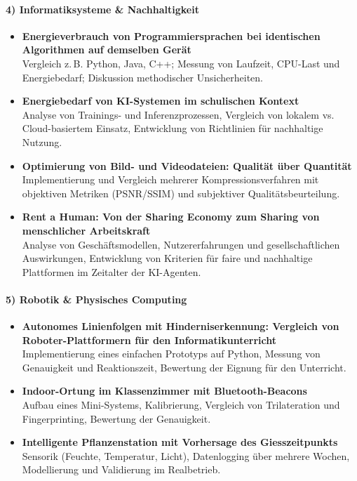 \paragraph{4) Informatiksysteme \& Nachhaltigkeit}
\begin{itemize}
    \item \textbf{Energieverbrauch von Programmiersprachen bei identischen Algorithmen auf demselben Gerät}\\
    Vergleich z.\,B. Python, Java, C++; Messung von Laufzeit, CPU-Last und Energiebedarf; Diskussion methodischer Unsicherheiten.
    \item \textbf{Energiebedarf von KI-Systemen im schulischen Kontext}\\
    Analyse von Trainings- und Inferenzprozessen, Vergleich von lokalem vs. Cloud-basiertem Einsatz, Entwicklung von Richtlinien für nachhaltige Nutzung.
    \item \textbf{Optimierung von Bild- und Videodateien: Qualität über Quantität}\\
    Implementierung und Vergleich mehrerer Kompressionsverfahren mit objektiven Metriken (PSNR/SSIM) und subjektiver Qualitätsbeurteilung.
    \item \textbf{Rent a Human: Von der Sharing Economy zum Sharing von menschlicher Arbeitskraft}\\
    Analyse von Geschäftsmodellen, Nutzererfahrungen und gesellschaftlichen Auswirkungen, Entwicklung von Kriterien für faire und nachhaltige Plattformen im Zeitalter der KI-Agenten.
\end{itemize}

\paragraph{5) Robotik \& Physisches Computing}
\begin{itemize}
    \item[\faStar{}] \textbf{Autonomes Linienfolgen mit Hinderniserkennung: Vergleich von Roboter-Plattformern für den Informatikunterricht}\\
    Implementierung eines einfachen Prototyps auf Python, Messung von Genauigkeit und Reaktionszeit, Bewertung der Eignung für den Unterricht.
    \item \textbf{Indoor-Ortung im Klassenzimmer mit Bluetooth-Beacons}\\
    Aufbau eines Mini-Systems, Kalibrierung, Vergleich von Trilateration und Fingerprinting, Bewertung der Genauigkeit.
    \item \textbf{Intelligente Pflanzenstation mit Vorhersage des Giesszeitpunkts}\\
    Sensorik (Feuchte, Temperatur, Licht), Datenlogging über mehrere Wochen, Modellierung und Validierung im Realbetrieb.
\end{itemize}

